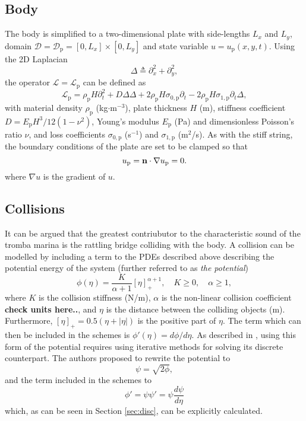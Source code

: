 \documentclass[dvipsnames]{article}
\begin{document}
\subsection{Body}
The body is simplified to a two-dimensional plate with side-lengths $L_x$ and $L_y$, domain $\mathcal{D} = \mathcal{D}_\text{p} = [0,L_x] \times [0,L_y]$ and state variable $u = u_\text{p}(x,y,t)$. Using the 2D Laplacian
\begin{equation}
    \Delta \triangleq \partial_x^2+\partial_y^2,
\end{equation}
the operator $\mathcal{L} = \mathcal{L}_\text{p}$ can be defined as
\begin{equation}
    \mathcal{L}_\text{p} = \rho_\text{p}H\partial_t^2 + D\Delta\Delta +2\rho_\text{p}H\sigma_{0,\text{p}}\partial_t-2\rho_\text{p}H\sigma_{1,\text{p}}\partial_t\Delta,
\end{equation}
with material density $\rho_\text{p}$ (kg$\cdot$m$^{-3}$), plate thickness $H$ (m), stiffness coefficient $D = E_\text{p}H^3/12(1-\nu^2)$, Young's modulus $E_\text{p}$ (Pa) and dimensionless Poisson's ratio $\nu$, and loss coefficients $\sigma_{0,\text{p}}$ (s$^{-1}$) and $\sigma_{1,\text{p}}$ (m$^2$/s). As with the stiff string, the boundary conditions of the plate are set to be clamped so that
\begin{equation}
    u_\text{p} = {\bf n} \cdot \nabla u_\text{p} = 0.
\end{equation}
where $\nabla u$ is the gradient of $u$.
\subsection{Collisions}
It can be argued that the greatest contriubutor to the characteristic sound of the tromba marina is the rattling bridge colliding with the body. A collision can be modelled by including a term to the PDEs described above describing the potential energy of the system (further referred to as \textit{the potential}) \cite{Ducceschi2019}
\begin{equation}\label{eq:potential}
    \phi(\eta) = \frac{K}{\alpha+1}[\eta]_+^{\alpha+1}, \quad K \geq 0,\quad \alpha \geq 1,
\end{equation}
where $K$ is the collision stiffness (N/m), $\alpha$ is the non-linear collision coefficient \textbf{check units here..}, and $\eta$ is the distance between the colliding objects (m). Furthermore, $[\eta]_+ = 0.5(\eta+|\eta|)$ is the positive part of $\eta$. The term which can then be included in the schemes is $\phi'(\eta) = d\phi/d\eta$. As described in \cite{Ducceschi2019}, using this form of the potential requires using iterative methods for solving its discrete counterpart. The authors proposed to rewrite the potential to
\begin{equation}
    \psi = \sqrt{2\phi},
\end{equation}
and the term included in the schemes to
\begin{equation}
    \phi' = \psi\psi' = \psi\frac{d\psi}{d\eta}
\end{equation}
which, as can be seen in Section \ref{sec:disc}, can be explicitly calculated. 
\end{document}

